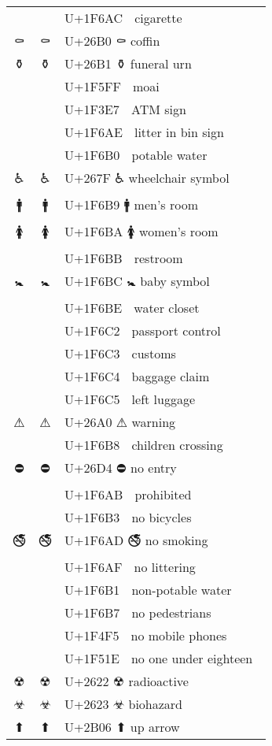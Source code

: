 \documentclass[a4paper,12pt]{article}
\newcommand{\fontA}[1]{{\fontspec[RawFeature={mode=harf,+dist,+ccmp}]{Segoe UI Emoji} #1}}
\newcommand{\fontB}[1]{{\fontspec[RawFeature={mode=harf,+dist,+ccmp}]{Noto Color Emoji} #1}}
\begin{document}
\begin{longtable}[c]{ccp{0.8\linewidth}}
\fontA{🚬}&\fontB{🚬}&U+1F6AC 🚬 cigarette\\
\fontA{⚰}&\fontB{⚰}&U+26B0 ⚰ coffin\\
\fontA{⚱}&\fontB{⚱}&U+26B1 ⚱ funeral urn\\
\fontA{🗿}&\fontB{🗿}&U+1F5FF 🗿 moai\\
\fontA{🏧}&\fontB{🏧}&U+1F3E7 🏧 ATM sign\\
\fontA{🚮}&\fontB{🚮}&U+1F6AE 🚮 litter in bin sign\\
\fontA{🚰}&\fontB{🚰}&U+1F6B0 🚰 potable water\\
\fontA{♿}&\fontB{♿}&U+267F ♿ wheelchair symbol\\
\fontA{🚹}&\fontB{🚹}&U+1F6B9 🚹 men’s room\\
\fontA{🚺}&\fontB{🚺}&U+1F6BA 🚺 women’s room\\
\fontA{🚻}&\fontB{🚻}&U+1F6BB 🚻 restroom\\
\fontA{🚼}&\fontB{🚼}&U+1F6BC 🚼 baby symbol\\
\fontA{🚾}&\fontB{🚾}&U+1F6BE 🚾 water closet\\
\fontA{🛂}&\fontB{🛂}&U+1F6C2 🛂 passport control\\
\fontA{🛃}&\fontB{🛃}&U+1F6C3 🛃 customs\\
\fontA{🛄}&\fontB{🛄}&U+1F6C4 🛄 baggage claim\\
\fontA{🛅}&\fontB{🛅}&U+1F6C5 🛅 left luggage\\
\fontA{⚠}&\fontB{⚠}&U+26A0 ⚠ warning\\
\fontA{🚸}&\fontB{🚸}&U+1F6B8 🚸 children crossing\\
\fontA{⛔}&\fontB{⛔}&U+26D4 ⛔ no entry\\
\fontA{🚫}&\fontB{🚫}&U+1F6AB 🚫 prohibited\\
\fontA{🚳}&\fontB{🚳}&U+1F6B3 🚳 no bicycles\\
\fontA{🚭}&\fontB{🚭}&U+1F6AD 🚭 no smoking\\
\fontA{🚯}&\fontB{🚯}&U+1F6AF 🚯 no littering\\
\fontA{🚱}&\fontB{🚱}&U+1F6B1 🚱 non-potable water\\
\fontA{🚷}&\fontB{🚷}&U+1F6B7 🚷 no pedestrians\\
\fontA{📵}&\fontB{📵}&U+1F4F5 📵 no mobile phones\\
\fontA{🔞}&\fontB{🔞}&U+1F51E 🔞 no one under eighteen\\
\fontA{☢}&\fontB{☢}&U+2622 ☢ radioactive\\
\fontA{☣}&\fontB{☣}&U+2623 ☣ biohazard\\
\fontA{⬆}&\fontB{⬆}&U+2B06 ⬆ up arrow\\

\end{longtable}
\end{document}
